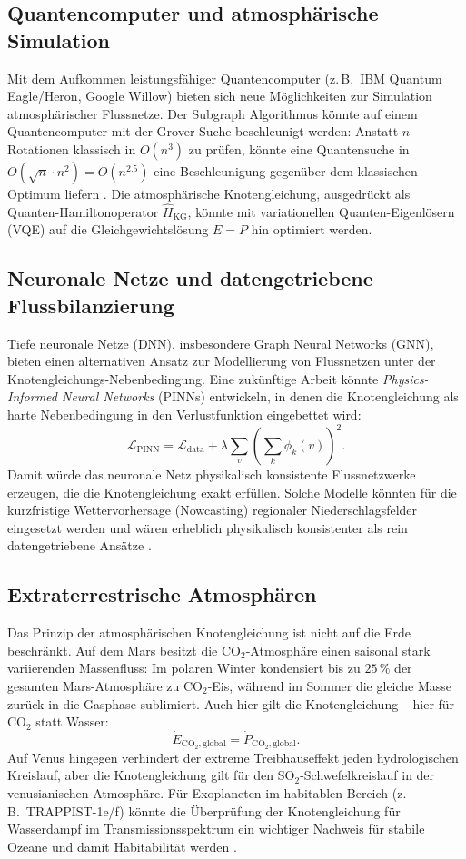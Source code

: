 ﻿\documentclass[a4paper,12pt]{article}
\theoremstyle{definition}
\begin{document}
\subsection{Quantencomputer und atmosphärische Simulation}

Mit dem Aufkommen leistungsfähiger Quantencomputer (z.\,B.\ IBM Quantum
Eagle/Heron, Google Willow) bieten sich neue Möglichkeiten zur Simulation
atmosphärischer Flussnetze. Der Subgraph Algorithmus könnte auf einem
Quanten\-computer mit der Grover-Suche beschleunigt werden: Anstatt $n$
Rotationen klassisch in $O(n^3)$ zu prüfen, könnte eine Quantensuche
in $O(\sqrt{n} \cdot n^2) = O(n^{2.5})$ eine Beschleunigung gegenüber
dem klassischen Optimum liefern \cite{grover1996}. Die atmosphärische
Knotengleichung, ausgedrückt als Quanten-Hamiltonoperator
$\hat{H}_\mathrm{KG}$, könnte mit variationellen Quanten-Eigenlösern
(VQE) auf die Gleichgewichtslösung $E = P$ hin optimiert werden.

\subsection{Neuronale Netze und datengetriebene Flussbilanzierung}

Tiefe neuronale Netze (DNN), insbesondere Graph Neural Networks (GNN),
bieten einen alternativen Ansatz zur Modellierung von Flussnetzen unter
der Knotengleichungs-Nebenbedingung. Eine zukünftige Arbeit könnte
\emph{Physics-Informed Neural Networks} (PINNs) entwickeln, in denen die
Knotengleichung als harte Nebenbedingung in den Verlust\-funktion eingebettet
wird:
\[
  \mathcal{L}_\mathrm{PINN} = \mathcal{L}_\mathrm{data}
  + \lambda \sum_v \left(\sum_k \phi_k(v)\right)^2.
\]
Damit würde das neuronale Netz physikalisch konsistente Flussnetzwerke
erzeugen, die die Knotengleichung exakt erfüllen. Solche Modelle könnten
für die kurz\-fristige Wettervorhersage (Nowcasting) regionaler
Niederschlagsfelder eingesetzt werden und wären erheblich physikalisch
konsistenter als rein daten\-getriebene Ansätze \cite{lecun2015}.

\subsection{Extraterrestrische Atmosphären}

Das Prinzip der atmosphärischen Knotengleichung ist nicht auf die Erde
beschränkt. Auf dem Mars besitzt die $\mathrm{CO}_2$-Atmosphäre einen
saisonal stark variierenden Massenfluss: Im polaren Winter kondensiert
bis zu $25\,\%$ der gesamten Mars-Atmosphäre zu $\mathrm{CO}_2$-Eis,
während im Sommer die gleiche Masse zurück in die Gasphase sublimiert.
Auch hier gilt die Knotengleichung -- hier für $\mathrm{CO}_2$ statt
Wasser:
\[
  \dot{E}_{\mathrm{CO}_2,\mathrm{global}} = \dot{P}_{\mathrm{CO}_2,\mathrm{global}}.
\]
Auf Venus hingegen verhindert der extreme Treibhauseffekt jeden
hydrologischen Kreislauf, aber die Knotengleichung gilt für den
$\mathrm{SO}_2$-Schwefelkreislauf in der venusianischen Atmosphäre.
Für Exoplaneten im habitablen Bereich (z.\,B.\ TRAPPIST-1e/f) könnte
die Überprüfung der Knotengleichung für Wasserdampf im Transmissions\-spektrum
ein wichtiger Nachweis für stabile Ozeane und damit Habitabilität werden
\cite{turbet2020}.
\end{document}
